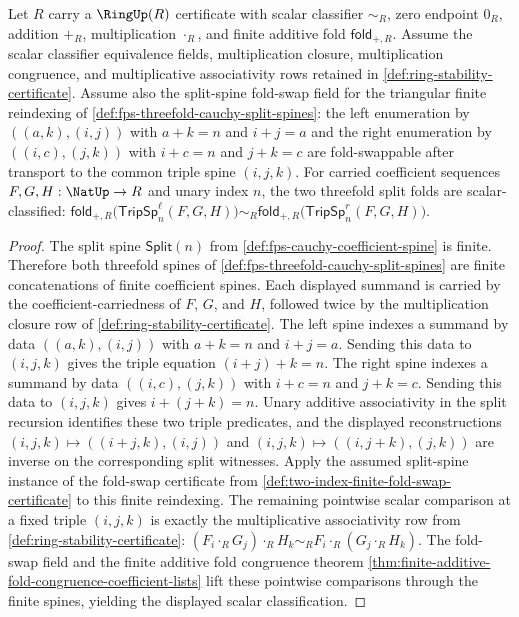 \begin{lemma}
\label{lem:fps-threefold-cauchy-split-reassociation-ringup}
Let $R$ carry a $\RingUp(R)$ certificate with scalar classifier $\sim_R$, zero endpoint $0_R$, addition $+_R$, multiplication $\cdot_R$, and finite additive fold $\mathsf{fold}_{+,R}$. Assume the scalar classifier equivalence fields, multiplication closure, multiplication congruence, and multiplicative associativity rows retained in \autoref{def:ring-stability-certificate}. Assume also the split-spine fold-swap field for the triangular finite reindexing of \autoref{def:fps-threefold-cauchy-split-spines}: the left enumeration by $((a,k),(i,j))$ with $a+k=n$ and $i+j=a$ and the right enumeration by $((i,c),(j,k))$ with $i+c=n$ and $j+k=c$ are fold-swappable after transport to the common triple spine $(i,j,k)$. For carried coefficient sequences $F,G,H:\NatUp\to R$ and unary index $n$, the two threefold split folds are scalar-classified: $\mathsf{fold}_{+,R}\bigl(\mathsf{TripSp}^{\ell}_n(F,G,H)\bigr)\sim_R\mathsf{fold}_{+,R}\bigl(\mathsf{TripSp}^{r}_n(F,G,H)\bigr)$.
\end{lemma}
\begin{proof}
The split spine $\mathsf{Split}(n)$ from \autoref{def:fps-cauchy-coefficient-spine} is finite. Therefore both threefold spines of \autoref{def:fps-threefold-cauchy-split-spines} are finite concatenations of finite coefficient spines. Each displayed summand is carried by the coefficient-carriedness of $F$, $G$, and $H$, followed twice by the multiplication closure row of \autoref{def:ring-stability-certificate}.
The left spine indexes a summand by data $((a,k),(i,j))$ with $a+k=n$ and $i+j=a$. Sending this data to $(i,j,k)$ gives the triple equation $(i+j)+k=n$. The right spine indexes a summand by data $((i,c),(j,k))$ with $i+c=n$ and $j+k=c$. Sending this data to $(i,j,k)$ gives $i+(j+k)=n$. Unary additive associativity in the split recursion identifies these two triple predicates, and the displayed reconstructions $(i,j,k)\mapsto((i+j,k),(i,j))$ and $(i,j,k)\mapsto((i,j+k),(j,k))$ are inverse on the corresponding split witnesses.
Apply the assumed split-spine instance of the fold-swap certificate from \autoref{def:two-index-finite-fold-swap-certificate} to this finite reindexing. The remaining pointwise scalar comparison at a fixed triple $(i,j,k)$ is exactly the multiplicative associativity row from \autoref{def:ring-stability-certificate}: $(F_i\cdot_R G_j)\cdot_R H_k\sim_R F_i\cdot_R(G_j\cdot_R H_k)$. The fold-swap field and the finite additive fold congruence theorem \autoref{thm:finite-additive-fold-congruence-coefficient-lists} lift these pointwise comparisons through the finite spines, yielding the displayed scalar classification.
\end{proof}
